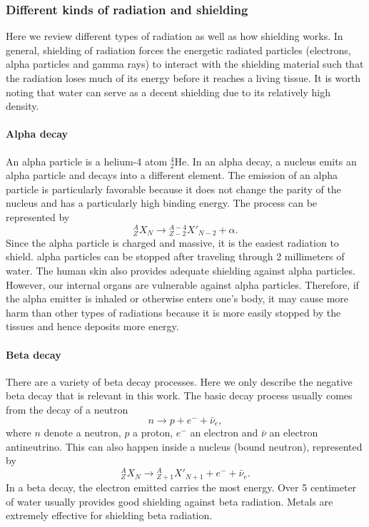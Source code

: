 \documentclass[nofootinbib,preprint,aps]{revtex4-1}
\begin{document}
        \subsubsection{Different kinds of radiation and shielding}
        Here we review different types of radiation as well as how shielding works. In general, shielding
        of radiation forces the energetic radiated particles (electrons, alpha particles and gamma rays) to
        interact with the shielding material such that the radiation loses much of its energy before it
        reaches a living tissue. It is worth noting that water can serve as a decent shielding due to its
        relatively high density.

        \paragraph{Alpha decay}
        An alpha particle is a helium-4 atom ${}^4_2$He. In an alpha decay, a nucleus emits an alpha
        particle and decays into a different element. The emission of an alpha particle is
        particularly favorable because it does not change the parity of the nucleus and has a particularly
        high binding energy. The process can be represented by
        \begin{equation}
            {}^A_Z X_N \rightarrow {}^{A-4}_{Z-2}X'_{N-2} + \alpha.
        \end{equation}
        Since the alpha particle is charged and massive, it is the easiest radiation to shield.
        alpha particles can be stopped after traveling through 2 millimeters of water. The human skin
        also provides adequate shielding against alpha particles. However, our internal organs are
        vulnerable against alpha particles. Therefore, if the alpha emitter is inhaled or otherwise enters
        one's body, it may cause more harm than other types of radiations because it is more easily stopped
        by the tissues and hence deposits more energy.

        \paragraph{Beta decay}
        There are a variety of beta decay processes. Here we only describe the negative beta decay that is
        relevant in this work. The basic decay process usually comes from the decay of a neutron
        \begin{equation}
            n \rightarrow p + e^- + \bar{\nu}_e,
        \end{equation}
        where $n$ denote  a neutron, $p$ a proton, $e^-$ an electron and $\bar{\nu}$ an electron antineutrino.
        This can also happen inside a nucleus (bound neutron), represented by
        \begin{equation}
            {}^A_Z X_N \rightarrow {}^A_{Z+1} X'_{N+1} + e^- + \bar{\nu}_e.
        \end{equation}
        In a beta decay, the electron emitted carries the most energy. Over 5 centimeter of water usually provides
        good shielding against beta radiation. Metals are extremely effective for shielding beta radiation.
        
\end{document}

